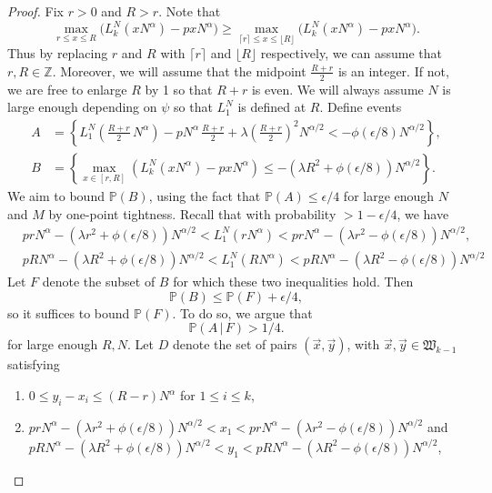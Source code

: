 \documentclass[12pt]{article}
\begin{document}
	\begin{proof}
		
	Fix $r>0$ and $R>r$. Note that
	\[
	\max_{r\leq x\leq R} \big(L_k^N(xN^\alpha) - pxN^\alpha\big) \geq \max_{\lceil r\rceil \leq x \leq \lfloor R\rfloor} \big(L_k^N(xN^\alpha) - pxN^\alpha\big).
	\]
	Thus by replacing $r$ and $R$ with $\lceil r\rceil$ and $\lfloor R\rfloor$ respectively, we can assume that $r,R\in\mathbb{Z}$. Moreover, we will assume that the midpoint $\frac{R+r}{2}$ is an integer. If not, we are free to enlarge $R$ by 1 so that $R+r$ is even. We will always assume $N$ is large enough depending on $\psi$ so that $L_1^N$ is defined at $R$. Define events
	\begin{align*}
	A &= \left\{L_1^N\left(\frac{R+r}{2}\,N^\alpha\right) - pN^\alpha\,\frac{R+r}{2} + \lambda\left(\frac{R+r}{2}\right)^2 N^{\alpha/2} < -\phi(\epsilon/8)N^{\alpha/2}\right\},\\
	B &= \left\{\max_{x\in[r,R]} \left(L_k^N(xN^\alpha) - pxN^\alpha\right) \leq -(\lambda R^2 + \phi(\epsilon/8)) N^{\alpha/2} \right\}.
	\end{align*}
	We aim to bound $\mathbb{P}(B)$, using the fact that $\mathbb{P}(A) \leq \epsilon/4$ for large enough $N$ and $M$ by one-point tightness. Recall that with probability $>1-\epsilon/4$, we have 
	\begin{align*}
	& prN^\alpha - (\lambda r^2+\phi(\epsilon/8))N^{\alpha/2} < L_1^N(rN^\alpha) <  prN^\alpha - (\lambda r^2-\phi(\epsilon/8))N^{\alpha/2},\\
	& pRN^\alpha - (\lambda R^2+\phi(\epsilon/8))N^{\alpha/2} < L_1^N(RN^\alpha) <  pRN^\alpha - (\lambda R^2-\phi(\epsilon/8))N^{\alpha/2}
	\end{align*}
	Let $F$ denote the subset of $B$ for which these two inequalities hold. Then 
	\[
	\mathbb{P}(B) \leq \mathbb{P}(F) + \epsilon/4,
	\]
	so it suffices to bound $\mathbb{P}(F)$. To do so, we argue that 
	\[
	\mathbb{P}(A\,|\,F) > 1/4.
	\]
	for large enough $R,N$. Let $D$ denote the set of pairs $(\vec{x},\vec{y})$, with $\vec{x},\vec{y}\in\mathfrak{W}_{k-1}$ satisfying 
	\begin{enumerate}[label=(\arabic*)]
		
		\item $0\leq y_i - x_i \leq (R-r)N^\alpha$ for $1\leq i\leq k$,
		
		\item $prN^\alpha - (\lambda r^2+\phi(\epsilon/8))N^{\alpha/2} < x_1 <  prN^\alpha - (\lambda r^2-\phi(\epsilon/8))N^{\alpha/2}$ and $pRN^\alpha - (\lambda R^2+\phi(\epsilon/8))N^{\alpha/2} < y_1 <  pRN^\alpha - (\lambda R^2-\phi(\epsilon/8))N^{\alpha/2}$,
		

\end{enumerate}
\end{proof}
\end{document}
